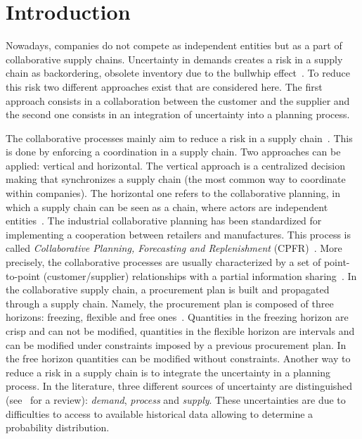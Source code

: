 \documentclass[11pt]{article}
\begin{document}
\section{Introduction}


Nowadays, companies do not  compete as independent
entities but as a part of collaborative supply chains. 
Uncertainty in  demands creates a risk in a supply chain as
backordering, obsolete inventory due to the bullwhip effect~\cite{LPW97}.
To reduce this risk two different approaches exist that are considered here.
The first approach consists in
a collaboration between the customer and the supplier and the second
one consists in an integration
of uncertainty into a planning process. 


The collaborative processes  mainly aim to reduce a risk in  a supply chain~\cite{GC09}.
This is done by
enforcing
a coordination in  a supply chain.
Two approaches can be applied: vertical and horizontal.
The vertical approach is a centralized decision making that synchronizes a supply chain 
(the most common
way to coordinate within companies). 
The horizontal one refers  to the collaborative
planning,   in which
a supply chain can be seen as a chain,
where actors are
independent entities~\cite{D09}.
The industrial collaborative planning 
 has been standardized for implementing a cooperation
between retailers and manufactures. This process is called \emph{Collaborative Planning,
Forecasting and Replenishment} (CPFR)~\cite{IC05}. More precisely, the
collaborative processes are usually characterized by a set of point-to-point (customer/supplier)
relationships with a partial information sharing~\cite{GC09,ASRS09}. 
In the  collaborative supply chain, a
procurement plan is built and propagated through a supply chain. Namely, 
the procurement plan is composed of three horizons:  freezing, flexible and free ones~\cite{GC09}. Quantities in the freezing horizon are crisp and can not be modified, quantities
 in the flexible horizon are intervals and can be modified under constraints 
imposed by a previous
procurement plan.  In the  free horizon quantities can be modified without constraints.
Another way to reduce a risk in a supply chain is to integrate
the uncertainty in a planning process. 
In the literature, 
three different sources of uncertainty are
distinguished  (see~\cite{PMPL09} for a review): \emph{demand}, \emph{process} 
and \emph{supply}.  
These uncertainties  are  due to  difficulties to access to available historical data allowing to 
determine a probability distribution. 
\end{document}
